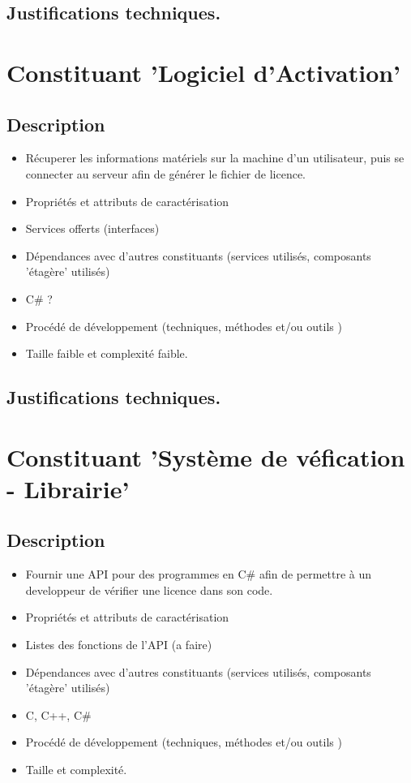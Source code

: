 \subsection{Justifications techniques.}

\section{Constituant 'Logiciel d'Activation'}
\subsection{Description}
\begin{itemize}
	\item Récuperer les informations matériels sur la machine d'un utilisateur, puis 
				se connecter au serveur afin de générer le fichier de licence.
	\item Propriétés et attributs de caractérisation
	\item Services offerts (interfaces)
	\item Dépendances avec d’autres constituants (services utilisés, composants 'étagère' utilisés)
	\item C\# ?
	\item Procédé de développement (techniques, méthodes et/ou outils )
	\item Taille faible et complexité faible. 
\end{itemize}
\subsection{Justifications techniques.}

\section{Constituant 'Système de véfication - Librairie'}
\subsection{Description}
\begin{itemize}
	\item Fournir une API pour des programmes en C\# afin de 
				permettre à un developpeur de vérifier une licence dans son code.
	\item Propriétés et attributs de caractérisation
	\item Listes des fonctions de l'API (a faire)
	\item Dépendances avec d’autres constituants (services utilisés, composants 'étagère' utilisés)
	\item C, C++, C\#
	\item Procédé de développement (techniques, méthodes et/ou outils )
	\item Taille et complexité.
\end{itemize}
